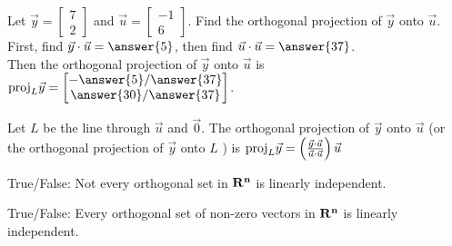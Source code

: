 \documentclass{ximera}
\newcommand{\RR}{\bf R}
\newcommand{\proj}{\mathop{\rm proj}}
\begin{document}
  	  		 \begin{question} Let $\vec{y} = \begin{bmatrix} 7\\2\end{bmatrix}$ and $\vec{u} = \begin{bmatrix}
  	  		 	-1\\6\end{bmatrix}$. Find the orthogonal projection of $\vec{y}$ onto $\vec{u}$.\\
  	  		 	
  	  		 	First, find $\vec{y}\cdot\vec{u} = \answer{5}$, then find $\vec{u}\cdot\vec{u} = \answer{37}$.\\
  	  		 	
  	  		 	Then the orthogonal projection of $\vec{y}$ onto $\vec{u}$ is ${\proj}_L\vec{y} = \begin{bmatrix} -\answer{5}/\answer{37} \\\answer{30}/\answer{37} \end{bmatrix}$.\\
  	  		 	\vspace{10pt}
  	  		 	\begin{hint}
  	  		 	Let $L$ be the line through $\vec{u}$ and $\vec{0}$. The orthogonal projection of $\vec{y}$ onto $\vec{u}$ (or the orthogonal projection of $\vec{y}$ onto $L$ ) is ${\proj}_L\vec{y} = \left(\frac{\vec{y}\cdot\vec{u}}{\vec{u}\cdot\vec{u}}\right)\vec{u}$ 
  	  		 		\end{hint}
  	  		 	
  	  		 	\end{question}
  	  		       \begin{question}True/False: Not every orthogonal set in $\RR^n$ is linearly independent.\\
  	  		       	 	\begin{multipleChoice}
  	  		       	 	\end{multipleChoice}
  	  		       	
  	  		       	\end{question}
  	  		          \begin{question}True/False: Every orthogonal set of non-zero vectors in $\RR^n$ is linearly independent.\\
  	  		          	\begin{multipleChoice}
  	  		          		\choice[correct]{True}
  	  		          		\choice{False}
  	  		          	\end{multipleChoice}
  	  		          	
  	  		          \end{question}
\end{document}
